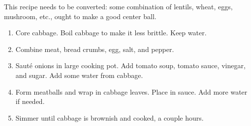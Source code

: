 

This recipe needs to be converted: some combination of lentils, wheat,
eggs, mushroom, etc., ought to make a good center ball.

\begin{ingredients}
\end{ingredients}


\begin{recipe}
  \begin{enumerate}

  \item Core cabbage.  Boil cabbage to make it less brittle.  Keep water.

  \item Combine meat, bread crumbs, egg, salt, and pepper.

  \item Saut\'e onions in large cooking pot.  Add tomato soup, tomato sauce,
    vinegar, and sugar.  Add some water from cabbage.

  \item Form meatballs and wrap in cabbage leaves.  Place in sauce.
    Add more water if needed.

  \item Simmer until cabbage is brownish and cooked, a couple hours.

  \end{enumerate}
\end{recipe}




\begin{ingredients}
\end{ingredients}


